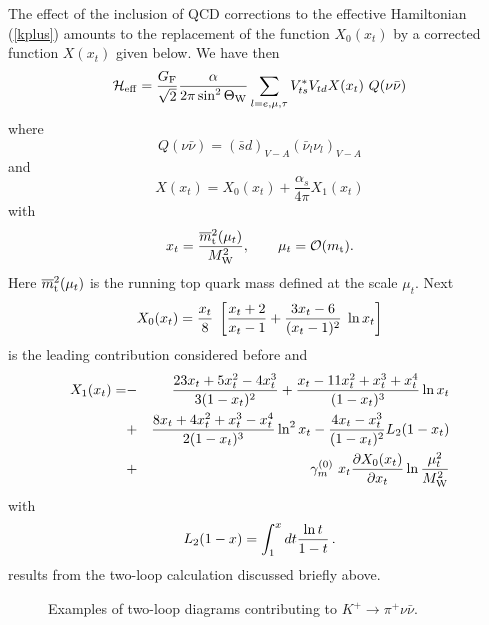 \documentclass[12pt,rotate]{article}
\def\as{\alpha_s}
\newcommand{\mt}{m_{\rm t}}
\newcommand{\mtb}{\overline{m}_{\rm t}}
\newcommand{\mw}{M_{\rm W}}
\newcommand{\be}{\begin{equation}}
\newcommand{\ee}{\end{equation}}
\newcommand{\f}{\frac}
\def\kpnn{$K^+\rightarrow\pi^+\nu\bar\nu$}
\def\aspi{\frac{\as}{4\pi}}
\begin{document}
\begin{itemize}
\begin{itemize}
The effect of the inclusion of QCD corrections
to the effective Hamiltonian  (\ref{kplus}) amounts to 
the replacement of the function $X_0(x_t)$ by a corrected
function $X(x_t)$ given below. We have then
\begin{equation}\label{hkpn0} 
{\cal H}_{\rm eff}={G_{\rm F} \over{\sqrt 2}}{\alpha\over 2\pi 
\sin^2\Theta_{\rm W}}
 \sum_{l=e,\mu,\tau}
V^{\ast}_{ts}V_{td} X(x_t)~Q(\nu\bar\nu)
 \end{equation}
where
\be
Q(\nu\bar\nu)=(\bar sd)_{V-A}(\bar\nu_l\nu_l)_{V-A} 
\ee
and
\begin{equation}\label{xx} 
X(x_t)=X_0(x_t)+\aspi X_1(x_t) 
\end{equation}
with
\be
x_t=\f{\mtb^2(\mu_t)}{\mw^2},
\qquad
\mu_t={\cal O}(\mt).
\ee
Here $\mtb^2(\mu_t)$ is the running top quark mass defined at the
scale $\mu_t$. Next \cite{IL}
\begin{equation}\label{X01}
X_0(x_t)={{x_t}\over{8}}\;\left[{{x_t+2}\over{x_t-1}} 
+ {{3 x_t-6}\over{(x_t -1)^2}}\; \ln x_t\right] 
\end{equation}
is the leading contribution considered before and \cite{BB1,BB2} 
\begin{eqnarray}\label{xx2}
X_1(x_t)=&-&{23x_t+5x_t^2-4x_t^3\over 3(1-x_t)^2}
+{x_t-11x_t^2+x_t^3+x_t^4\over (1-x_t)^3}\ln x_t
\nonumber\\
&+&{8x_t+4x_t^2+x_t^3-x_t^4\over 2(1-x_t)^3}\ln^2 x_t
-{4x_t-x_t^3\over (1-x_t)^2}L_2(1-x_t)
\nonumber\\
&+&\gamma^{(0)}_m~
 x_t{\partial X_0(x_t)\over\partial x_t}\ln \f{\mu_t^2}{\mw^2}
\end{eqnarray}
with
\begin{equation}\label{l2} 
L_2(1-x)=\int^x_1 dt {\ln t\over 1-t}   \,.
\end{equation}
results from the two-loop calculation discussed briefly above.

\begin{figure}[hbt]
\vspace{0.10in}
\centerline{
\epsfysize=3in
}%
\vspace{0.08in}
\caption[]{Examples of two-loop diagrams contributing to \kpnn .
\label{L:7}}
\end{figure}
 

\end{itemize}
\end{itemize}
\end{document}
